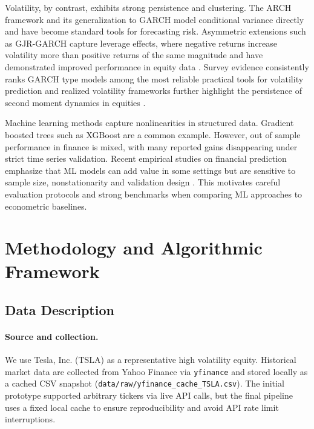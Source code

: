 \documentclass[11pt,a4paper]{article}
\begin{document}
\noindent Volatility, by contrast, exhibits strong persistence and clustering. The ARCH framework \parencite{Engle1982} and its generalization to GARCH \parencite{Bollerslev1986} model conditional variance directly and have become standard tools for forecasting risk. Asymmetric extensions such as GJR-GARCH \parencite{Glosten1993} capture leverage effects, where negative returns increase volatility more than positive returns of the same magnitude and have demonstrated improved performance in equity data \parencite{Hansen2005}. Survey evidence consistently ranks GARCH type models among the most reliable practical tools for volatility prediction \parencite{Poon2003} and realized volatility frameworks further highlight the persistence of second moment dynamics in equities \parencite{Andersen2003}.

\noindent Machine learning methods capture nonlinearities in structured data. Gradient boosted trees such as XGBoost \parencite{Chen2016} are a common example. However, out of sample performance in finance is mixed, with many reported gains disappearing under strict time series validation. Recent empirical studies on financial prediction emphasize that ML models can add value in some settings but are sensitive to sample size, nonstationarity and validation design \parencite{Gu2020,Krauss2017}. This motivates careful evaluation protocols and strong benchmarks when comparing ML approaches to econometric baselines.
\endgroup

\section{Methodology and Algorithmic Framework}
\label{sec:methodology}

\subsection{Data Description}
\label{subsec:data}

\paragraph{Source and collection.}
We use Tesla, Inc. (TSLA) as a representative high volatility equity. Historical market data are collected from Yahoo Finance via \texttt{yfinance} and stored locally as a cached CSV snapshot (\texttt{data/raw/yfinance\_cache\_TSLA.csv}). The initial prototype supported arbitrary tickers via live API calls, but the final pipeline uses a fixed local cache to ensure reproducibility and avoid API rate limit interruptions.
\end{document}
